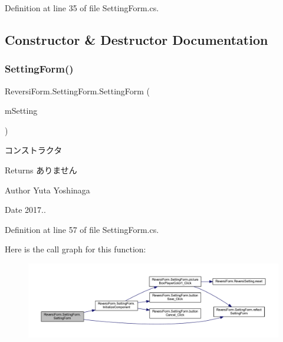 Definition at line 35 of file Setting\+Form.\+cs.



\subsection{Constructor \& Destructor Documentation}
\mbox{\label{class_reversi_form_1_1_setting_form_ac0583da0aa8221e0851b147271361ca8}} 
\subsubsection{\texorpdfstring{Setting\+Form()}{SettingForm()}}
{\footnotesize\ttfamily Reversi\+Form.\+Setting\+Form.\+Setting\+Form (\begin{DoxyParamCaption}\item[{\hyperlink{class_reversi_form_1_1_reversi_setting}{Reversi\+Setting}}]{m\+Setting }\end{DoxyParamCaption})}



コンストラクタ 

\begin{DoxyReturn}{Returns}
ありません 
\end{DoxyReturn}
\begin{DoxyAuthor}{Author}
Yuta Yoshinaga 
\end{DoxyAuthor}
\begin{DoxyDate}{Date}
2017.. 
\end{DoxyDate}


Definition at line 57 of file Setting\+Form.\+cs.

Here is the call graph for this function\+:\nopagebreak
\begin{figure}[H]
\begin{center}
\leavevmode
\includegraphics[width=350pt]{class_reversi_form_1_1_setting_form_ac0583da0aa8221e0851b147271361ca8_cgraph}
\end{center}
\end{figure}


